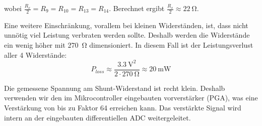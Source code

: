 wobei  $\frac{R_x}{2}  =  R_{9}  =  R_{10} = R_{13} = R_{14}$. Berechnet  ergibt
$\frac{R_x}{2} \approx \SI{22}{\ohm}$.

Eine weitere Einschr\"ankung, vorallem bei  kleinen  Widerst\"anden,  ist,  dass
nicht  unn\"otig  viel  Leistung  verbraten  werden sollte. Deshalb  werden  die
Widerst\"ande ein wenig h\"oher mit \SI{270}{\ohm} dimensioniert. In diesem Fall
ist der Leistungsverlust aller 4 Widerst\"ande:
\begin{equation*}
    P_{loss} \approx \frac{\SI{3.3}{\volt}^2}{2\cdot \SI{270}{\ohm}} \approx \SI{20}{\milli\watt}
\end{equation*}

Die gemessene Spannung  am  Shunt-Widerstand  ist recht klein. Deshalb verwenden
wir  den  im  Mikrocontroller  eingebauten  vorverst\"arker  (PGA),   was   eine
Verst\"arkung von bis  zu Faktor 64 erreichen kann. Das verst\"arkte Signal wird
intern an der eingebauten differentiellen ADC weitergeleitet.

